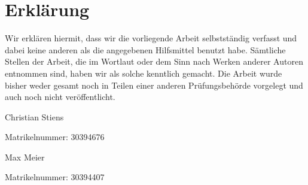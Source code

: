 \section*{Erklärung}

Wir erklären hiermit, dass wir die vorliegende Arbeit selbstständig verfasst und dabei keine anderen als die angegebenen Hilfsmittel benutzt habe. Sämtliche Stellen der Arbeit, die im Wortlaut oder dem Sinn nach Werken anderer Autoren entnommen sind, haben wir als solche kenntlich gemacht. Die Arbeit wurde bisher weder gesamt noch in Teilen einer anderen Prüfungsbehörde vorgelegt und auch noch nicht veröffentlicht.

\bigskip
\noindent
\datum

\vspace{25mm}

\noindent

Christian Stiens

Matrikelnummer: 30394676

\vspace{25mm}

Max Meier

Matrikelnummer: 30394407
